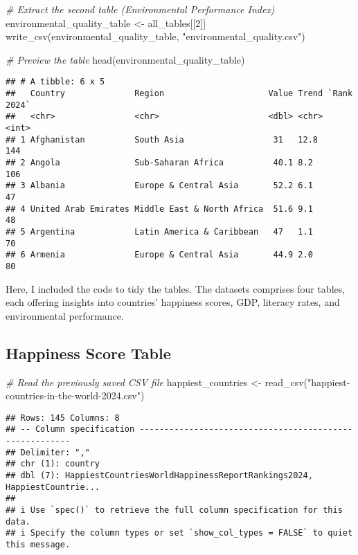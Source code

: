 \documentclass[
]{article}
\newenvironment{Shaded}{\begin{snugshade}}{\end{snugshade}}
\newcommand{\CommentTok}[1]{\textcolor[rgb]{0.56,0.35,0.01}{\textit{#1}}}
\newcommand{\DecValTok}[1]{\textcolor[rgb]{0.00,0.00,0.81}{#1}}
\newcommand{\FunctionTok}[1]{\textcolor[rgb]{0.00,0.00,0.00}{#1}}
\newcommand{\NormalTok}[1]{#1}
\newcommand{\OtherTok}[1]{\textcolor[rgb]{0.56,0.35,0.01}{#1}}
\newcommand{\StringTok}[1]{\textcolor[rgb]{0.31,0.60,0.02}{#1}}
\begin{document}
\begin{Shaded}
\begin{Highlighting}[]
\CommentTok{\# Extract the second table (Environmental Performance Index)}
\NormalTok{environmental\_quality\_table }\OtherTok{\textless{}{-}}\NormalTok{ all\_tables[[}\DecValTok{2}\NormalTok{]]}
\FunctionTok{write\_csv}\NormalTok{(environmental\_quality\_table, }\StringTok{"environmental\_quality.csv"}\NormalTok{)}

\CommentTok{\# Preview the table}
\FunctionTok{head}\NormalTok{(environmental\_quality\_table)}
\end{Highlighting}
\end{Shaded}

\begin{verbatim}
## # A tibble: 6 x 5
##   Country              Region                     Value Trend `Rank 2024`
##   <chr>                <chr>                      <dbl> <chr>       <int>
## 1 Afghanistan          South Asia                  31   12.8          144
## 2 Angola               Sub-Saharan Africa          40.1 8.2           106
## 3 Albania              Europe & Central Asia       52.2 6.1            47
## 4 United Arab Emirates Middle East & North Africa  51.6 9.1            48
## 5 Argentina            Latin America & Caribbean   47   1.1            70
## 6 Armenia              Europe & Central Asia       44.9 2.0            80
\end{verbatim}

Here, I included the code to tidy the tables. The datasets comprises
four tables, each offering insights into countries' happiness scores,
GDP, literacy rates, and environmental performance.

\hypertarget{happiness-score-table}{%
\subsection{Happiness Score Table}\label{happiness-score-table}}

\begin{Shaded}
\begin{Highlighting}[]
\CommentTok{\# Read the previously saved CSV file}
\NormalTok{happiest\_countries }\OtherTok{\textless{}{-}} \FunctionTok{read\_csv}\NormalTok{(}\StringTok{"happiest{-}countries{-}in{-}the{-}world{-}2024.csv"}\NormalTok{)}
\end{Highlighting}
\end{Shaded}

\begin{verbatim}
## Rows: 145 Columns: 8
## -- Column specification --------------------------------------------------------
## Delimiter: ","
## chr (1): country
## dbl (7): HappiestCountriesWorldHappinessReportRankings2024, HappiestCountrie...
## 
## i Use `spec()` to retrieve the full column specification for this data.
## i Specify the column types or set `show_col_types = FALSE` to quiet this message.
\end{verbatim}
\end{document}

